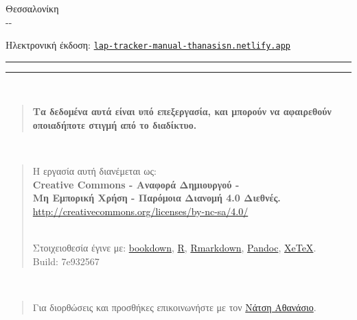 \documentclass[
  a4paper,
  twoside,
  titlepage,
  11pt]{article}
\numberwithin{equation}{section}
\numberwithin{figure}{section}
\numberwithin{table}{section}
\begin{document}
\begin{titlepage}
    \vfill %


    {Θεσσαλονίκη}\\
    {\large \textsc{\the\year-\the\month-\the\day}}\par %


    \vfill


    {\small{Ηλεκτρονική έκδοση:} \large\texttt{\href{https://lap-tracker-manual-thanasisn.netlify.app}{lap-tracker-manual-thanasisn.netlify.app}}}\\

    \rule{\textwidth}{0.4pt}\par %
    \vspace{2pt}\vspace{-\baselineskip} %
    \rule{\textwidth}{1pt}\par %
\end{titlepage}
\newpage

{
\hypersetup{linkcolor=}
\setcounter{tocdepth}{3}
\tableofcontents
}
\listoffigures
\listoftables
\newpage

~
\vfill
~

\begin{quote}
\textbf{Τα δεδομένα αυτά είναι υπό επεξεργασία, και μπορούν να αφαιρεθούν οποιαδήποτε στιγμή από το διαδίκτυο.}
\end{quote}

~
\vfill
~

\begin{quote}
Η εργασία αυτή διανέμεται ως:\\
\textbf{Creative Commons - Αναφορά Δημιουργού -}\\
\textbf{Μη Εμπορική Χρήση - Παρόμοια Διανομή 4.0 Διεθνές.}\\
\url{http://creativecommons.org/licenses/by-nc-sa/4.0/}\strut \\
Στοιχειοθεσία έγινε με: \href{https://bookdown.org/}{bookdown}, \href{https://www.r-project.org/}{R}, \href{http://rmarkdown.rstudio.com/}{Rmarkdown}, \href{https://pandoc.org/}{Pandoc}, \href{http://xetex.sourceforge.net/}{XeTeX}.\\
Build: 7e932567
\end{quote}

~
\vfill
~

\begin{quote}
Για διορθώσεις και προσθήκες επικοινωνήστε με τον \href{mailto:natsisphysicist@gmail.com}{Νάτση Αθανάσιο}.
\end{quote}
\end{document}
